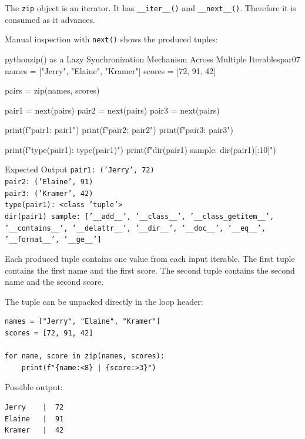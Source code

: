 \documentclass[a4paper,twoside]{report}
\begin{document}
The \texttt{zip} object is an iterator. It has \texttt{\_\_iter\_\_()} and \texttt{\_\_next\_\_()}. Therefore it is consumed as it advances.

Manual inspection with \texttt{next()} shows the produced tuples:

\begin{codebox}[]{python}{zip() as a Lazy Synchronization Mechanism Across Multiple Iterables}{par07}
names = ["Jerry", "Elaine", "Kramer"]
scores = [72, 91, 42]

pairs = zip(names, scores)

pair1 = next(pairs)
pair2 = next(pairs)
pair3 = next(pairs)

print(f"pair1: {pair1}")
print(f"pair2: {pair2}")
print(f"pair3: {pair3}")

print(f"type(pair1): {type(pair1)}")
print(f"dir(pair1) sample: {dir(pair1)[:10]}")
\end{codebox}


\begin{iobox}{Expected Output}
\texttt{pair1: ('Jerry', 72)} \\
\texttt{pair2: ('Elaine', 91)} \\
\texttt{pair3: ('Kramer', 42)} \\
\texttt{type(pair1): <class 'tuple'>} \\
\texttt{dir(pair1) sample: ['\_\_add\_\_', '\_\_class\_\_', '\_\_class\_getitem\_\_',} \\
\texttt{'\_\_contains\_\_', '\_\_delattr\_\_', '\_\_dir\_\_', '\_\_doc\_\_', '\_\_eq\_\_',} \\
\texttt{'\_\_format\_\_', '\_\_ge\_\_']} \\
\end{iobox}


Each produced tuple contains one value from each input iterable. The first tuple contains the first name and the first score. The second tuple contains the second name and the second score.

The tuple can be unpacked directly in the loop header:

\begin{verbatim}
names = ["Jerry", "Elaine", "Kramer"]
scores = [72, 91, 42]

for name, score in zip(names, scores):
    print(f"{name:<8} | {score:>3}")
\end{verbatim}

Possible output:

\begin{verbatim}
Jerry    |  72
Elaine   |  91
Kramer   |  42
\end{verbatim}
\end{document}
